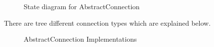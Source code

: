 \begin{figure}[H]
 \centering
 \caption{State diagram for AbstractConnection}
 \label{fig:network.discovery.connection.state}
\end{figure}

There are tree different connection types which are explained below.

\begin{figure}[H]
 \centering
 \caption{AbstractConnection Implementations}
 \label{fig:network.discovery.connection.uml}
\end{figure}


